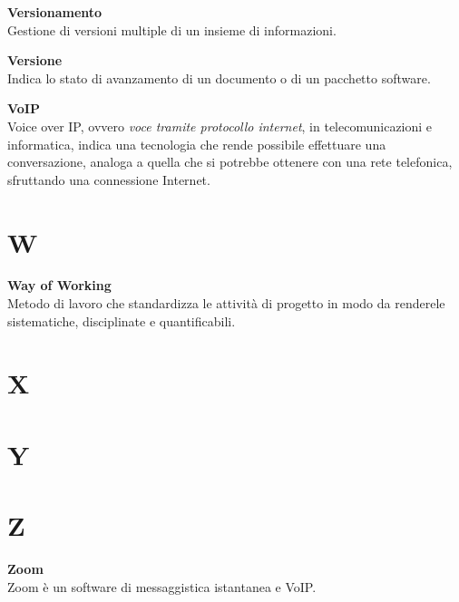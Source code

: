 \documentclass[a4paper, oneside, openany, dvipsnames, table, 12pt]{article}
\begin{document}
\textbf{Versionamento} \\
Gestione di versioni multiple di un insieme di informazioni.

\textbf{Versione} \\
Indica lo stato di avanzamento di un documento o di un pacchetto software.

\textbf{VoIP} \\
Voice over IP, ovvero \textit{voce tramite protocollo internet}, in telecomunicazioni e informatica, indica una tecnologia che rende possibile effettuare una conversazione, analoga a quella che si potrebbe ottenere con una rete telefonica, sfruttando una connessione Internet.

\newpage
\section{W}
\textbf{Way of Working} \\
Metodo di lavoro che standardizza le attività di progetto in modo da renderele sistematiche, disciplinate e quantificabili.

\newpage
\section{X}

\newpage
\section{Y}

\newpage
\section{Z}
\textbf{Zoom} \\
Zoom è un software di messaggistica istantanea e VoIP\glo. 
\end{document}
